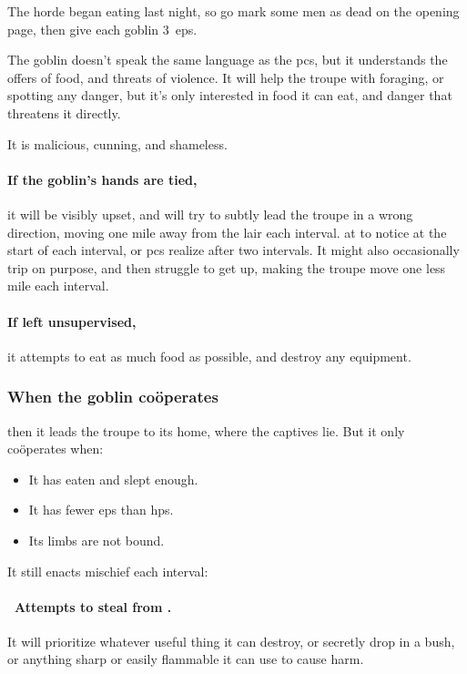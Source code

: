\documentclass[10pt,twoside]{book}
\begin{document}
The horde began eating last night, so go mark some men as dead on the opening page, then give each goblin 3~\glspl{ep}.

The goblin doesn't speak the same language as the \glspl{pc}, but it understands the offers of food, and threats of violence.
It will help the troupe with foraging, or spotting any danger, but it's only interested in food it can eat, and danger that threatens it directly.

It is malicious, cunning, and shameless.

\paragraph{If the goblin's hands are tied,}
it will be visibly upset, and will try to subtly lead the troupe in a wrong direction, moving one mile away from the lair each \gls{interval}.
 at \tn[10] to notice at the start of each \gls{interval}, or \glspl{pc} realize after two \glspl{interval}.
It might also occasionally trip on purpose, and then struggle to get up, making the troupe move one less mile each \gls{interval}.

\paragraph{If left unsupervised,}
it attempts to eat as much food as possible, and destroy any equipment.

\subsubsection{When the goblin co\"operates}
then it leads the troupe to its home, where the captives lie.
But it only co\"operates when:

\begin{itemize}
  \item
  It has eaten and slept enough.
  \item
  It has fewer \glspl{ep} than \glspl{hp}.
  \item
  Its limbs are not bound.
\end{itemize}

It still enacts mischief each \gls{interval}:

\paragraph{\Square~Attempts to steal from .}
It will prioritize whatever useful thing it can destroy, or secretly drop in a bush, or anything sharp or easily flammable it can use to cause harm.
\end{document}
